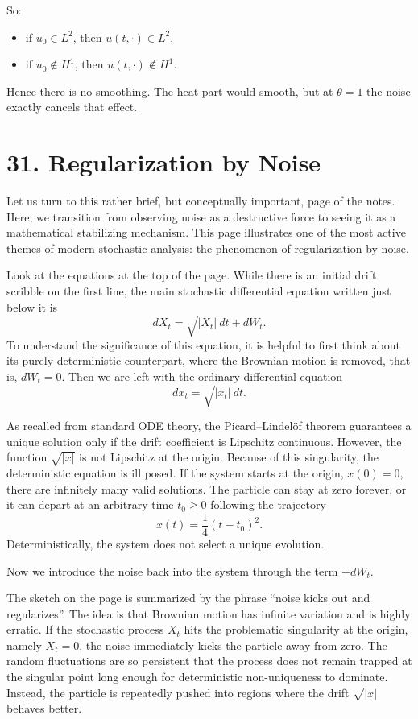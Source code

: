 \documentclass[11pt]{article}
\theoremstyle{definition}
\theoremstyle{remark}
\begin{document}
So:
\begin{itemize}
\item if $u_0\in L^2$, then $u(t,\cdot)\in L^2$,
\item if $u_0\notin H^1$, then $u(t,\cdot)\notin H^1$.
\end{itemize}
Hence there is no smoothing. The heat part would smooth, but at $\theta=1$ the noise exactly cancels that effect.


\section*{31. Regularization by Noise}
Let us turn to this rather brief, but conceptually important, page of the notes. Here, we transition from observing noise as a destructive force to seeing it as a mathematical stabilizing mechanism. This page illustrates one of the most active themes of modern stochastic analysis: the phenomenon of regularization by noise.

Look at the equations at the top of the page. While there is an initial drift scribble on the first line, the main stochastic differential equation written just below it is
\[
dX_t=\sqrt{|X_t|}\,dt+dW_t.
\]
To understand the significance of this equation, it is helpful to first think about its purely deterministic counterpart, where the Brownian motion is removed, that is, $dW_t=0$. Then we are left with the ordinary differential equation
\[
dx_t=\sqrt{|x_t|}\,dt.
\]

As recalled from standard ODE theory, the Picard--Lindel\"of theorem guarantees a unique solution only if the drift coefficient is Lipschitz continuous. However, the function $\sqrt{|x|}$ is not Lipschitz at the origin. Because of this singularity, the deterministic equation is ill posed. If the system starts at the origin, $x(0)=0$, there are infinitely many valid solutions. The particle can stay at zero forever, or it can depart at an arbitrary time $t_0\ge 0$ following the trajectory
\[
x(t)=\frac14 (t-t_0)^2.
\]
Deterministically, the system does not select a unique evolution.

Now we introduce the noise back into the system through the term $+dW_t$.

The sketch on the page is summarized by the phrase ``noise kicks out and regularizes''. The idea is that Brownian motion has infinite variation and is highly erratic. If the stochastic process $X_t$ hits the problematic singularity at the origin, namely $X_t=0$, the noise immediately kicks the particle away from zero. The random fluctuations are so persistent that the process does not remain trapped at the singular point long enough for deterministic non-uniqueness to dominate. Instead, the particle is repeatedly pushed into regions where the drift $\sqrt{|x|}$ behaves better.
\end{document}
